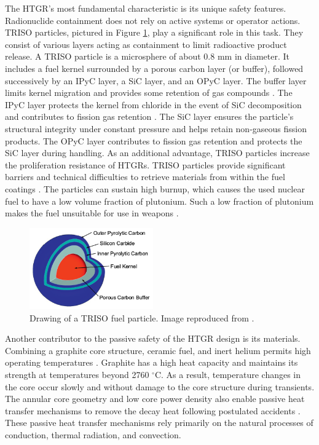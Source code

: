 The HTGR's most fundamental characteristic is its unique safety features.
Radionuclide containment does not rely on active systems or operator actions.
\gls{TRISO} particles, pictured in Figure \ref{fig:triso}, play a significant role in this task.
They consist of various layers acting as containment to limit radioactive product release.
A \gls{TRISO} particle is a microsphere of about 0.8 mm in diameter.
It includes a fuel kernel surrounded by a porous carbon layer (or buffer), followed successively by an \gls{IPyC} layer, a \gls{SiC} layer, and an \gls{OPyC} layer.
The buffer layer limits kernel migration and provides some retention of gas compounds \cite{oecd_nea_benchmark_2017}.
The \gls{IPyC} layer protects the kernel from chloride in the event of \gls{SiC} decomposition and contributes to fission gas retention \cite{demkowickz_paul_triso_2019}.
The \gls{SiC} layer ensures the particle's structural integrity under constant pressure and helps retain non-gaseous fission products.
The \gls{OPyC} layer contributes to fission gas retention and protects the \gls{SiC} layer during handling.
As an additional advantage, \gls{TRISO} particles increase the proliferation resistance of \glspl{HTGR}.
TRISO particles provide significant barriers and technical difficulties to retrieve materials from within the fuel coatings \cite{paviet-hartmann_analysis_2011}.
The particles can sustain high burnup, which causes the used nuclear fuel to have a low volume fraction of plutonium.
Such a low fraction of plutonium makes the fuel unsuitable for use in weapons \cite{paviet-hartmann_analysis_2011}.

\begin{figure}[htbp!]
	\centering
	\includegraphics[height=3.5cm]{figures/triso}
	\caption{Drawing of a TRISO fuel particle. Image reproduced from \cite{hales_multidimensional_2013}.}
	\label{fig:triso}
\end{figure}

Another contributor to the passive safety of the \gls{HTGR} design is its materials.
Combining a graphite core structure, ceramic fuel, and inert helium permits high operating temperatures \cite{ballinger_balance_2004}.
Graphite has a high heat capacity and maintains its strength at temperatures beyond 2760 $^{\circ}$C.
As a result, temperature changes in the core occur slowly and without damage to the core structure during transients.
The annular core geometry and low core power density also enable passive heat transfer mechanisms to remove the decay heat following postulated accidents \cite{neylan_modular_1988}.
These passive heat transfer mechanisms rely primarily on the natural processes of conduction, thermal radiation, and convection.

